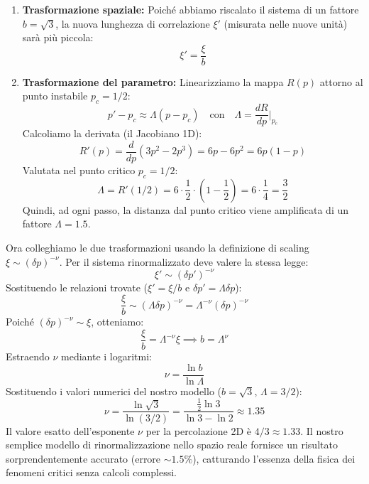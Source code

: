 \begin{enumerate}
    \item \textbf{Trasformazione spaziale:} Poiché abbiamo riscalato il sistema di un fattore $b = \sqrt{3}$, la nuova lunghezza di correlazione $\xi'$ (misurata nelle nuove unità) sarà più piccola:
    \begin{equation} \label{eq:xi_scaling}
        \xi' = \frac{\xi}{b}
    \end{equation}

    \item \textbf{Trasformazione del parametro:} Linearizziamo la mappa $R(p)$ attorno al punto instabile $p_c = 1/2$:
    \begin{equation}
        p' - p_c \approx \Lambda (p - p_c) \quad \text{con} \quad \Lambda = \frac{dR}{dp}\bigg|_{p_c}
    \end{equation}
    Calcoliamo la derivata (il Jacobiano 1D):
    \begin{equation}
        R'(p) = \frac{d}{dp}(3p^2 - 2p^3) = 6p - 6p^2 = 6p(1-p)
    \end{equation}
    Valutata nel punto critico $p_c = 1/2$:
    \begin{equation}
        \Lambda = R'(1/2) = 6 \cdot \frac{1}{2} \cdot \left(1 - \frac{1}{2}\right) = 6 \cdot \frac{1}{4} = \frac{3}{2}
    \end{equation}
    Quindi, ad ogni passo, la distanza dal punto critico viene amplificata di un fattore $\Lambda = 1.5$.
\end{enumerate}
Ora colleghiamo le due trasformazioni usando la definizione di scaling $\xi \sim (\delta p)^{-\nu}$.
Per il sistema rinormalizzato deve valere la stessa legge:
\begin{equation}
    \xi' \sim (\delta p')^{-\nu}
\end{equation}
Sostituendo le relazioni trovate ($\xi' = \xi/b$ e $\delta p' = \Lambda \delta p$):
\begin{equation}
    \frac{\xi}{b} \sim (\Lambda \delta p)^{-\nu} = \Lambda^{-\nu} (\delta p)^{-\nu}
\end{equation}
Poiché $(\delta p)^{-\nu} \sim \xi$, otteniamo:
\begin{equation}
    \frac{\xi}{b} = \Lambda^{-\nu} \xi \implies b = \Lambda^{\nu}
\end{equation}
Estraendo $\nu$ mediante i logaritmi:
\begin{equation}
    \nu = \frac{\ln b}{\ln \Lambda}
\end{equation}
Sostituendo i valori numerici del nostro modello ($b=\sqrt{3}$, $\Lambda=3/2$):
\begin{equation}
    \nu = \frac{\ln \sqrt{3}}{\ln (3/2)} = \frac{\frac{1}{2} \ln 3}{\ln 3 - \ln 2} \approx 1.35
\end{equation}
Il valore esatto dell'esponente $\nu$ per la percolazione 2D è $4/3 \approx 1.33$. Il nostro semplice modello di rinormalizzazione nello spazio reale fornisce un risultato sorprendentemente accurato (errore $\sim 1.5\%$), catturando l'essenza della fisica dei fenomeni critici senza calcoli complessi.